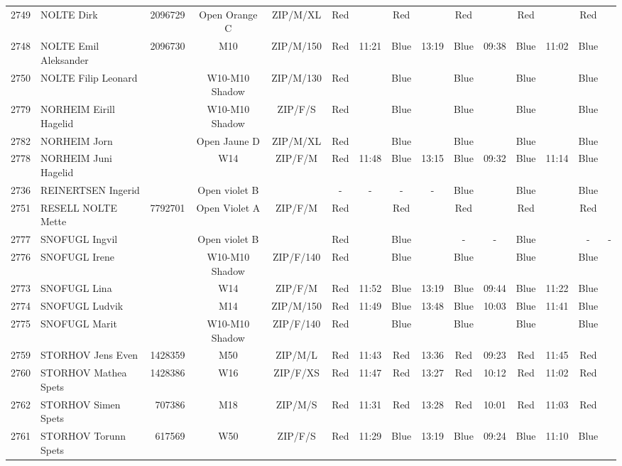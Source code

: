 \documentclass{report}
\begin{document}
\begin{longtable}{|c|l|r|c|c|*{5}{cc|}}
    2749 & NOLTE Dirk & 2096729 & Open Orange C & ZIP/M/XL & Red &   & Red &   & Red &   & Red &   & Red &  \\
    2748 & NOLTE Emil Aleksander & 2096730 & M10 & ZIP/M/150 & Red & 11:21 & Blue & 13:19 & Blue & 09:38 & Blue & 11:02 & Blue &  \\
    2750 & NOLTE Filip Leonard &  & W10-M10 Shadow & ZIP/M/130 & Red &   & Blue &   & Blue &   & Blue &   & Blue &  \\
    2779 & NORHEIM Eirill Hagelid &  & W10-M10 Shadow & ZIP/F/S & Red &   & Blue &   & Blue &   & Blue &   & Blue &  \\
    2782 & NORHEIM Jorn &  & Open Jaune D & ZIP/M/XL & Red &   & Blue &   & Blue &   & Blue &   & Blue &  \\
    2778 & NORHEIM Juni Hagelid &  & W14 & ZIP/F/M & Red & 11:48 & Blue & 13:15 & Blue & 09:32 & Blue & 11:14 & Blue &  \\
    2736 & REINERTSEN Ingerid &  & Open violet B &   & - &  - & - &  - & Blue &   & Blue &   & Blue &  \\
    2751 & RESELL NOLTE Mette & 7792701 & Open Violet A & ZIP/F/M & Red &   & Red &   & Red &   & Red &   & Red &  \\
    2777 & SNOFUGL Ingvil &  & Open violet B &   & Red &   & Blue &   & - &  - & Blue &   & - &  -\\
    2776 & SNOFUGL Irene &  & W10-M10 Shadow & ZIP/F/140 & Red &   & Blue &   & Blue &   & Blue &   & Blue &  \\
    2773 & SNOFUGL Lina &  & W14 & ZIP/F/M & Red & 11:52 & Blue & 13:19 & Blue & 09:44 & Blue & 11:22 & Blue &  \\
    2774 & SNOFUGL Ludvik &  & M14 & ZIP/M/150 & Red & 11:49 & Blue & 13:48 & Blue & 10:03 & Blue & 11:41 & Blue &  \\
    2775 & SNOFUGL Marit &  & W10-M10 Shadow & ZIP/F/140 & Red &   & Blue &   & Blue &   & Blue &   & Blue &  \\
    2759 & STORHOV Jens Even & 1428359 & M50 & ZIP/M/L & Red & 11:43 & Red & 13:36 & Red & 09:23 & Red & 11:45 & Red &  \\
    2760 & STORHOV Mathea Spets & 1428386 & W16 & ZIP/F/XS & Red & 11:47 & Red & 13:27 & Red & 10:12 & Red & 11:02 & Red &  \\
    2762 & STORHOV Simen Spets & 707386 & M18 & ZIP/M/S & Red & 11:31 & Red & 13:28 & Red & 10:01 & Red & 11:03 & Red &  \\
    2761 & STORHOV Torunn Spets & 617569 & W50 & ZIP/F/S & Red & 11:29 & Blue & 13:19 & Blue & 09:24 & Blue & 11:10 & Blue &  \\

\end{longtable}
\end{document}

